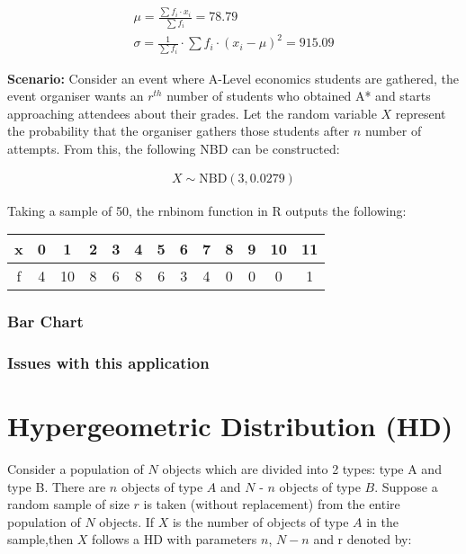 \documentclass{article}
\begin{document}
\begin{gather*}
  \mu = \frac{\sum {f_i \cdot x_i}}{\sum f_i} = 78.79 \\[5pt]
  \sigma = \frac{1}{\sum f_i} \cdot \sum {f_i \cdot (x_i - \mu)^2} = 915.09
\end{gather*}

\textbf{Scenario:} Consider an event
where A-Level economics students are gathered, the event organiser
wants an $ r^{th} $ number of students who obtained A* and starts 
approaching attendees about their grades. Let the random variable
$ X $ represent the probability that the organiser gathers
those students after $ n $ number of attempts. From this, the
following NBD can be constructed:

\begin{gather*}
  X \sim \text{NBD}(3, 0.0279)
\end{gather*}

Taking a sample of 50, the rnbinom function in R outputs the following:

\begin{center}
  \begin{tabular}{|c|c|c|c|c|c|c|c|c|c|c|c|c|}
    \hline
    x & 0 & 1 & 2 & 3 & 4 & 5 & 6 & 7 & 8 & 9 & 10 & 11 \\
    \hline
    f & 4 & 10 & 8 & 6 & 8 & 6 & 3 & 4 & 0 & 0 & 0 & 1\\
    \hline
  \end{tabular}
\end{center}


\subsubsection{Bar Chart}

\subsubsection{Issues with this application}

\section{Hypergeometric Distribution (HD)}
Consider a population of $N$ objects which are divided into 2 types: type A and type B.
There are
$n$ objects of type $A$ and $N$ - $n$ objects of type $B$.
Suppose a random sample of size $r$ is taken
(without replacement) from the entire population of $N$ objects. If $X$ 
is the number of objects of
type $A$ in the sample,then $X$ follows a HD with parameters $n$, 
$N-n$ and r denoted by:
\end{document}
